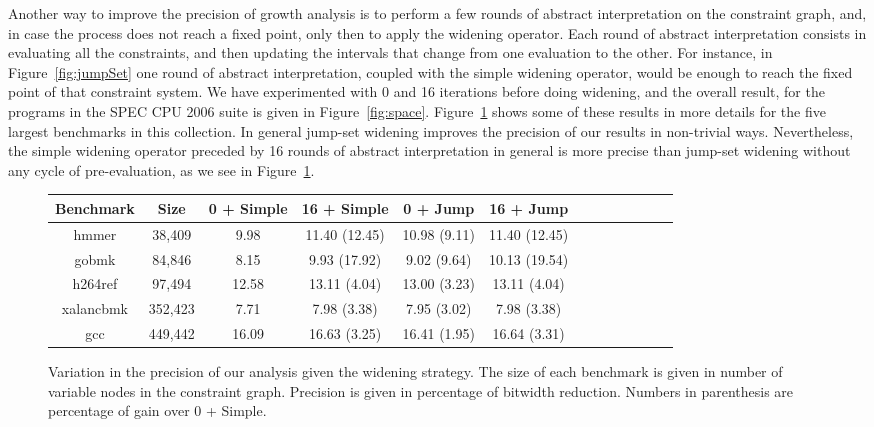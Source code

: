 \documentclass[preprint]{elsarticle}
\begin{document}
Another way to improve the precision of growth analysis is to perform a few
rounds of abstract interpretation on the constraint graph, and, in case the
process does not reach a fixed point, only then to apply the widening operator.
Each round of abstract interpretation consists in evaluating all the
constraints, and then updating the intervals that change from one evaluation to
the other.
For instance, in Figure~\ref{fig:jumpSet} one round of abstract interpretation,
coupled with the simple widening operator, would be enough to reach the
fixed point of that constraint system.
We have experimented with 0 and 16 iterations before doing widening, and the
overall result, for the programs in the SPEC CPU 2006 suite is given in
Figure~\ref{fig:space}.
Figure~\ref{fig:wideningPrec} shows some of these results in more details
for the five largest benchmarks in this collection.
In general jump-set widening improves the precision of our results in
non-trivial ways.
Nevertheless, the simple widening operator preceded by 16 rounds of
abstract interpretation in general is more precise than jump-set widening
without any cycle of pre-evaluation, as we see in Figure~\ref{fig:wideningPrec}.

\begin{figure}[t!]
\begin{small}
\begin{center}
\renewcommand{\tabcolsep}{0.2cm}
\begin{tabular}{|c|c|c|c|c|c|c|c|c|c|c|c|c|} \hline
Benchmark &    Size & 0 + Simple &   16 + Simple &     0 + Jump & 16 + Jump \\ \hline
hmmer     &  38,409 &       9.98 & 11.40 (12.45) & 10.98 (9.11) & 11.40 (12.45) \\ \hline
gobmk     &  84,846 &       8.15 &  9.93 (17.92) &  9.02 (9.64) & 10.13 (19.54) \\ \hline
h264ref   &  97,494 &      12.58 &  13.11 (4.04) & 13.00 (3.23) & 13.11 (4.04) \\ \hline
xalancbmk & 352,423 &       7.71 &   7.98 (3.38) &  7.95 (3.02) & 7.98 (3.38) \\ \hline
gcc       & 449,442 &      16.09 &  16.63 (3.25) & 16.41 (1.95) & 16.64 (3.31) \\ \hline
\end{tabular}
\end{center}
\end{small}
\caption{\label{fig:wideningPrec}
Variation in the precision of our analysis given the widening strategy.
The size of each benchmark is given in number of variable nodes in the
constraint graph.
Precision is given in percentage of bitwidth reduction.
Numbers in parenthesis are percentage of gain over 0 + Simple.}
\end{figure}
\end{document}
